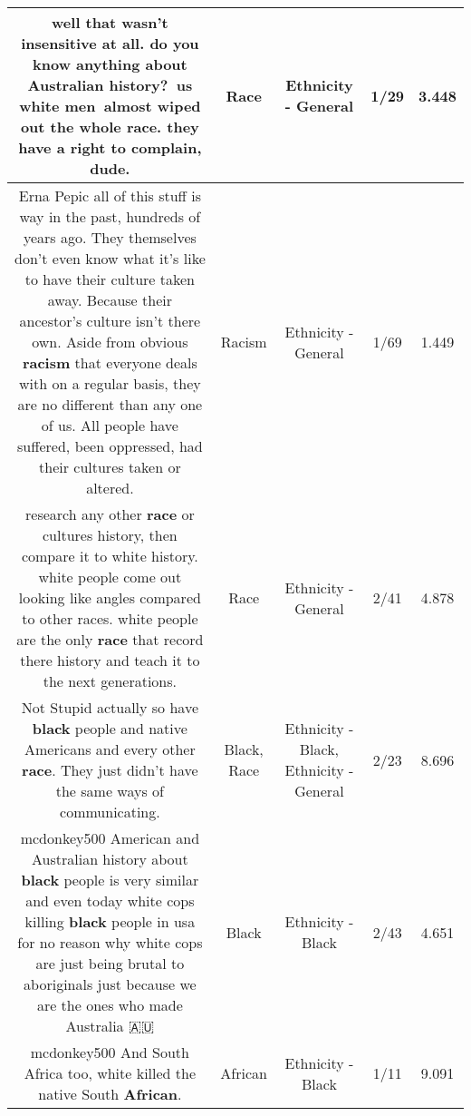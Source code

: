 \documentclass[11pt]{article}
\newlength\mylength
\begin{document}
\begin{center}
\begin{longtable}{|C{.65\mylength}|C{.30\mylength}|C{.12\mylength}|C{.12\mylength}|C{.12\mylength}|}
  \small well that wasn't insensitive at all. do you know anything about Australian history? us white men almost wiped out the whole \textbf{race}. they have a right to complain, dude.\normalsize   & Race & Ethnicity - General & 1/29 & 3.448 \\  \hline
  \small Erna Pepic all of this stuff is way in the past, hundreds of years ago. They themselves don't even know what it's like to have their culture taken away. Because their ancestor's culture isn't there own. Aside from obvious \textbf{racism} that everyone deals with on a regular basis, they are no different than any one of us. All people have suffered, been oppressed, had their cultures taken or altered.\normalsize   & Racism & Ethnicity - General & 1/69 & 1.449 \\  \hline
  \small research any other \textbf{race} or cultures history, then compare it to white history. white people come out looking like angles compared to other races. white people are the only \textbf{race} that record there history and teach it to the next generations.\normalsize   & Race & Ethnicity - General & 2/41 & 4.878 \\  \hline
  \small Not Stupid actually so have \textbf{black} people and native Americans and every other \textbf{race}. They just didn't have the same ways of communicating.\normalsize   & Black, Race & Ethnicity - Black, Ethnicity - General & 2/23 & 8.696 \\  \hline
  \small mcdonkey500 American and Australian history about \textbf{black} people is very similar and even today white cops killing \textbf{black} people in usa for no reason why white cops are just being brutal to aboriginals just because we are the ones who made Australia 🇦🇺\normalsize   & Black & Ethnicity - Black & 2/43 & 4.651 \\  \hline
  \small mcdonkey500 And South Africa too, white killed the native South \textbf{African}.\normalsize   & African & Ethnicity - Black & 1/11 & 9.091 \\  \hline

\end{longtable}
\end{center}
\end{document}
